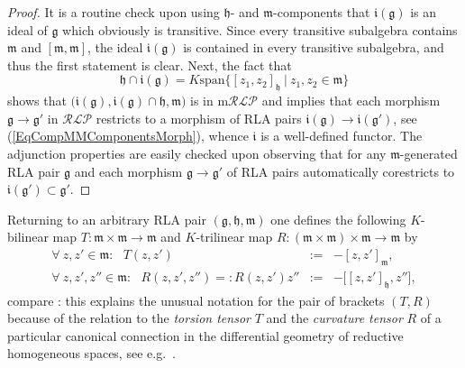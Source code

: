 \documentclass [11pt] {article}
\theoremstyle{definition}
\begin{document}
\begin{proof}
It is a routine check upon using $\mathfrak{h}$- and $\mathfrak{m}$-components
that $\mathfrak{i}(\mathfrak{g})$ is an ideal of $\mathfrak{g}$ which obviously is
transitive. Since every transitive subalgebra contains $\mathfrak{m}$ and 
$[\mathfrak{m},\mathfrak{m}]$, the ideal $\mathfrak{i}(\mathfrak{g})$ is contained in
every transitive subalgebra, and thus the first statement is clear. Next,
the fact that
\begin{equation}\label{EqCompHCompOfLieIdealI}
	\mathfrak{h}\cap \mathfrak{i}(\mathfrak{g})
	=K\mathrm{span}\big\{[z_1,z_2]_\mathfrak{h}
	~\big|~z_1,z_2\in\mathfrak{m}\big\}
\end{equation}
shows that $\big(\mathfrak{i}(\mathfrak{g}),\mathfrak{i}(\mathfrak{g})\cap \mathfrak{h},\mathfrak{m}\big)$ is in $\mathrm{m}\mathcal{RLP}$ and
implies that each morphism $\mathfrak{g}\to\mathfrak{g}'$ in $\mathcal{RLP}$ restricts to a morphism of RLA pairs $\mathfrak{i}(\mathfrak{g})\to
\mathfrak{i}(\mathfrak{g}')$, see (\ref{EqCompMMComponentsMorph}), whence
$\boldsymbol{\mathfrak{i}}$ is a well-defined functor. The adjunction properties are easily checked upon observing that for any
$\mathfrak{m}$-generated RLA pair $\mathfrak{g}$ and each morphism
$\mathfrak{g}\to\mathfrak{g}'$ of RLA pairs automatically corestricts to
$\mathfrak{i}(\mathfrak{g}')\subset \mathfrak{g}'$. 
\end{proof}

\noindent 
Returning to an arbitrary RLA pair $(\mathfrak{g},\mathfrak{h},\mathfrak{m})$
one defines the following $K$-bilinear map
$T:\mathfrak{m}\times\mathfrak{m}\to \mathfrak{m}$
and $K$-trilinear map
$R:(\mathfrak{m}\times\mathfrak{m})\times \mathfrak{m}\to \mathfrak{m}$ by 
\begin{eqnarray}
\forall~z,z'\in
\mathfrak{m}:~~~	T(z,z') & := &  -[z,z']_\mathfrak{m},
	   \label{EqDefRLAMapT}\\
\forall~z,z',z''\in
\mathfrak{m}:~~~	R(z,z',z'')=:R(z,z')z'' 
	  & := & -\big[[z,z']_\mathfrak{h},z''\big],
	  \label{EqDefRLAMapR}
\end{eqnarray}
compare \cite[p.~193,~Thm.~2.6,(1),(2)]{KN69}: this explains the unusual notation for the pair of brackets $(T,R)$
because of the relation to the \textit{torsion tensor} $T$ and the \textit{curvature tensor} $R$ of a particular canonical connection in the differential geometry of reductive homogeneous spaces, see e.g.~\cite[p.~190]{KN69}. 
\end{document}
